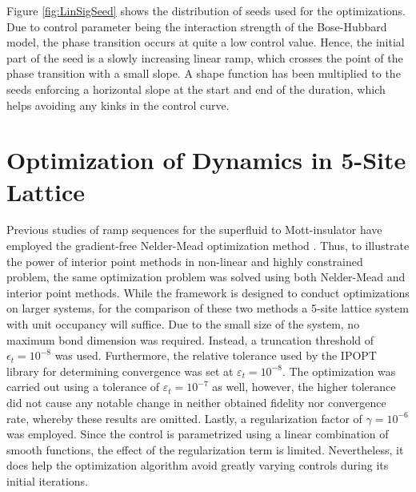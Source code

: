 Figure \ref{fig:LinSigSeed} shows the distribution of seeds used for the optimizations. Due to control parameter being the interaction strength of the Bose-Hubbard model, the phase transition occurs at quite a low control value. Hence, the initial part of the seed is a slowly increasing linear ramp, which crosses the point of the phase transition with a small slope. A shape function has been multiplied to the seeds enforcing a horizontal slope at the start and end of the duration, which helps avoiding any kinks in the control curve.



\section{Optimization of Dynamics in 5-Site Lattice} \label{sec:5partOptimization}
Previous studies of ramp sequences for the superfluid to Mott-insulator have employed the gradient-free Nelder-Mead optimization method \cite{Doria2011,FrankBloch}. Thus, to illustrate the power of interior point methods in non-linear and highly constrained problem, the same optimization problem was solved using both Nelder-Mead and interior point methods. While the framework is designed to conduct optimizations on larger systems, for the comparison of these two methods a 5-site lattice system with unit occupancy will suffice. Due to the small size of the system, no maximum bond dimension was required. Instead, a truncation threshold of $\epsilon_t = 10^{-8}$ was used. Furthermore, the relative tolerance used by the IPOPT library for determining convergence was set at $\varepsilon_t = 10^{-8}$. The optimization was carried out using a tolerance of $\varepsilon_t = 10^{-7}$ as well, however, the higher tolerance did not cause any notable change in neither obtained fidelity nor convergence rate, whereby these results are omitted.
Lastly, a regularization factor of $\gamma = 10^{-6}$ was employed. Since the control is parametrized using a linear combination of smooth functions, the effect of the regularization term is limited. Nevertheless, it does help the optimization algorithm avoid greatly varying controls during its initial iterations.
 

